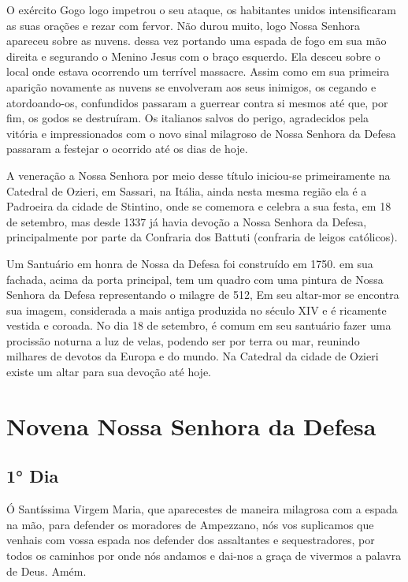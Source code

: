 \documentclass[a4paper,14pt]{extarticle} \usepackage[utf8]{inputenc}
\begin{document}
O exército Gogo logo impetrou o seu ataque, os habitantes unidos intensificaram as suas orações e rezar com fervor. Não durou muito, logo Nossa Senhora apareceu sobre as nuvens. dessa vez portando uma espada de fogo em sua mão direita e segurando o Menino Jesus com o braço esquerdo. Ela desceu sobre o local onde estava ocorrendo um terrível massacre. Assim como em sua primeira aparição novamente as nuvens se envolveram aos seus inimigos, os cegando e atordoando-os, confundidos passaram a guerrear contra si mesmos até que, por fim, os godos se destruíram. Os italianos salvos do perigo, agradecidos pela vitória e impressionados com o novo sinal milagroso de Nossa Senhora da Defesa passaram a festejar o ocorrido até os dias de hoje.

A veneração a Nossa Senhora por meio desse título iniciou-se primeiramente na Catedral de Ozieri, em Sassari, na Itália, ainda nesta mesma região ela é a Padroeira da cidade de Stintino, onde se comemora e celebra a sua festa, em 18 de setembro, mas desde 1337 já havia devoção a Nossa Senhora da Defesa, principalmente por parte da Confraria dos Battuti (confraria de leigos católicos).

Um Santuário em honra de Nossa da Defesa foi construído em 1750. em sua fachada, acima da porta principal, tem um quadro com uma pintura de Nossa Senhora da Defesa representando o milagre de 512, Em seu altar-mor se encontra sua imagem, considerada a mais antiga produzida no século XIV e é ricamente vestida e coroada. No dia 18 de setembro, é comum em seu santuário fazer uma procissão noturna a luz de velas, podendo ser por terra ou mar, reunindo milhares de devotos da Europa e do mundo. Na Catedral da cidade de Ozieri existe um altar para sua devoção até hoje. 


\newpage

\section{Novena Nossa Senhora da Defesa}

\subsection{1° Dia}

Ó Santíssima Virgem Maria, que aparecestes de maneira milagrosa com a espada na mão, para defender os moradores de Ampezzano, nós vos suplicamos que venhais com vossa espada nos defender dos assaltantes e sequestradores, por todos os caminhos por onde nós andamos e dai-nos a graça de vivermos a palavra de Deus. Amém. 
\end{document}
